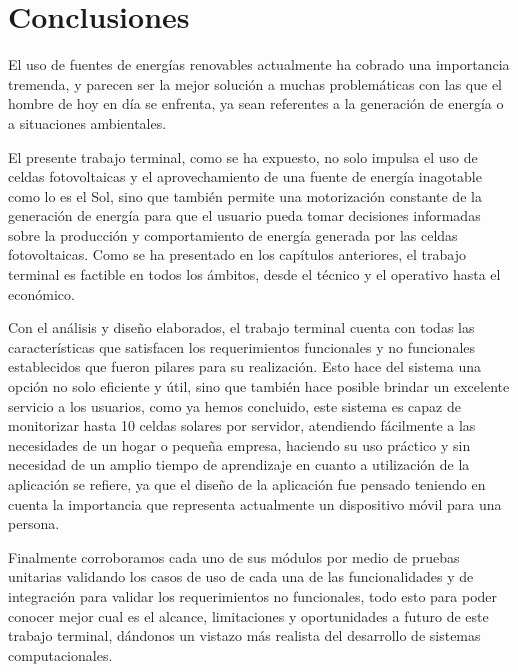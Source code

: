 \chapter{Conclusiones}\label{chapter6}

El uso de fuentes de energías renovables actualmente ha cobrado una importancia tremenda, y parecen ser la mejor solución a muchas problemáticas con las que el hombre de hoy en día se enfrenta, ya sean referentes a la generación de energía o a situaciones ambientales.

\newline El presente trabajo terminal, como se ha expuesto, no solo impulsa el uso de celdas fotovoltaicas y el aprovechamiento de una fuente de energía inagotable como lo es el Sol, sino que también permite una motorización constante de la generación de energía para que el usuario pueda tomar decisiones informadas sobre la producción y comportamiento de energía generada por las celdas fotovoltaicas. Como se ha presentado en los capítulos anteriores, el trabajo terminal es factible en todos los ámbitos, desde el técnico y el operativo hasta el económico.

\newline Con el análisis y diseño elaborados, el trabajo terminal cuenta con todas las características que satisfacen los requerimientos funcionales y no funcionales establecidos que fueron pilares para su realización. Esto hace del sistema una opción no solo eficiente y útil, sino que también hace posible brindar un excelente servicio a los usuarios, como ya hemos concluido, este sistema es capaz de monitorizar hasta 10 celdas solares por servidor, atendiendo fácilmente a las necesidades de un hogar o pequeña empresa, haciendo su uso práctico y sin necesidad de un amplio tiempo de aprendizaje en cuanto a utilización de la aplicación se refiere, ya que el diseño de la aplicación fue pensado teniendo en cuenta la importancia que representa actualmente un dispositivo móvil para una persona.

\newline Finalmente corroboramos cada uno de sus módulos por medio de pruebas unitarias validando los casos de uso de cada una de las funcionalidades y de integración para validar los requerimientos no funcionales, todo esto para poder conocer mejor cual es el alcance, limitaciones y oportunidades a futuro de este trabajo terminal, dándonos un vistazo más realista del desarrollo de sistemas computacionales.
